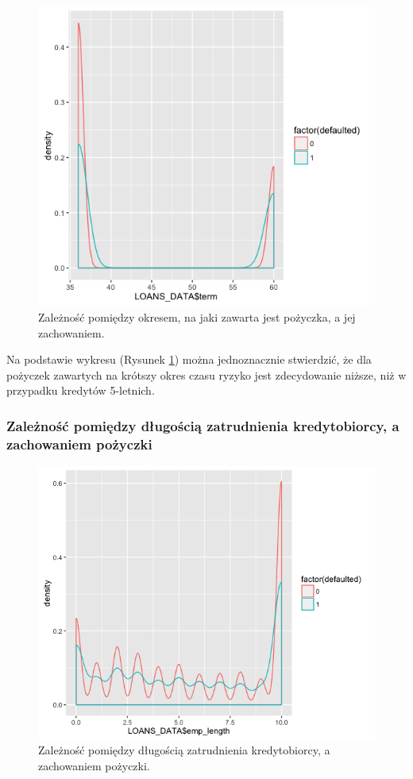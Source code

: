 \begin{figure}[H] \centering %
	\includegraphics[scale=0.7]{img/term_defaulted.png}
	\caption{Zależność pomiędzy okresem, na jaki zawarta jest pożyczka, a jej zachowaniem.}
	\label{lc:term_defaulted}
\end{figure}

Na podstawie wykresu (Rysunek \ref{lc:term_defaulted}) można jednoznacznie stwierdzić, że dla pożyczek zawartych na krótszy okres czasu ryzyko jest zdecydowanie niższe, niż w przypadku kredytów 5-letnich.

\subsubsection{Zależność pomiędzy długością zatrudnienia kredytobiorcy, a zachowaniem pożyczki}

\begin{figure}[H] \centering %
	\includegraphics[scale=0.7]{img/emp_defaulted.png}
	\caption{Zależność pomiędzy długością zatrudnienia kredytobiorcy, a zachowaniem pożyczki.}
	\label{lc:emp_defaulted}
\end{figure}

